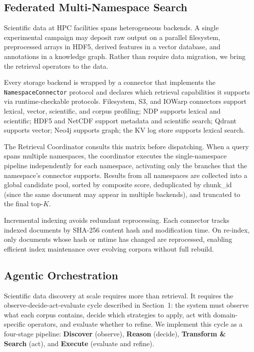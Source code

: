 \subsection{Federated Multi-Namespace Search}

Scientific data at HPC facilities spans heterogeneous backends. A single experimental campaign may deposit raw output on a parallel filesystem, preprocessed arrays in HDF5, derived features in a vector database, and annotations in a knowledge graph. Rather than require data migration, we bring the retrieval operators to the data.

Every storage backend is wrapped by a connector that implements the \texttt{NamespaceConnector} protocol and declares which retrieval capabilities it supports via runtime-checkable protocols. Filesystem, S3, and IOWarp connectors support lexical, vector, scientific, and corpus profiling; NDP supports lexical and scientific; HDF5 and NetCDF support metadata and scientific search; Qdrant supports vector; Neo4j supports graph; the KV log store supports lexical search.

The Retrieval Coordinator consults this matrix before dispatching. When a query spans multiple namespaces, the coordinator executes the single-namespace pipeline independently for each namespace, activating only the branches that the namespace's connector supports. Results from all namespaces are collected into a global candidate pool, sorted by composite score, deduplicated by chunk\_id (since the same document may appear in multiple backends), and truncated to the final top-$K$.

Incremental indexing avoids redundant reprocessing. Each connector tracks indexed documents by SHA-256 content hash and modification time. On re-index, only documents whose hash or mtime has changed are reprocessed, enabling efficient index maintenance over evolving corpora without full rebuild.

\subsection{Agentic Orchestration}

Scientific data discovery at scale requires more than retrieval. It requires the observe-decide-act-evaluate cycle described in Section~1: the system must observe what each corpus contains, decide which strategies to apply, act with domain-specific operators, and evaluate whether to refine. We implement this cycle as a four-stage pipeline: \textbf{Discover} (observe), \textbf{Reason} (decide), \textbf{Transform \& Search} (act), and \textbf{Execute} (evaluate and refine).

